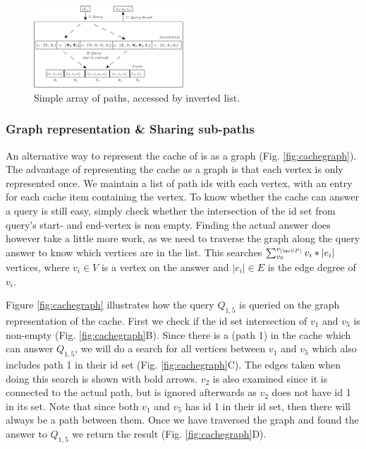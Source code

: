 \begin{figure}[hbt]
  \center
        \includegraphics[width=0.50\textwidth]{figures/cachearrayinvertlist.pdf}
        \caption{Simple array of paths, accessed by inverted list.}
  \label{fig:cacheinvertlist}
\end{figure}


\subsubsection{Graph representation \& Sharing sub-paths}%

An alternative way to represent the cache of \spaths is as a graph (Fig. \ref{fig:cachegraph}). The advantage of representing the cache as a graph is that each vertex is only represented once. We maintain a list of path ids with each vertex, with an entry for each cache item containing the vertex. 
To know whether the cache can answer a query is still easy, simply check whether the intersection of the \spath id set from query's start- and end-vertex is non empty. Finding the actual answer does however take a little more work, as we need to traverse the graph along the \spath query answer to know which vertices are in the list. This searches $\sum_{v_0}^{v_{|\spathns |}} v_i*|e_i|$ vertices, where $v_i \in V$ is a vertex on the \spath answer and $|e_i| \in E $ is the edge degree of $v_i$.

Figure \ref{fig:cachegraph} illustrates how the query $Q_{1,5}$ is queried on the graph representation of the cache. First we check if the \spath id set intersection of $v_1$ and $v_5$ is non-empty (Fig. \ref{fig:cachegraph}B). Since there is a \spath (path 1) in the cache which can answer $Q_{1,5}$, we will do a search for all vertices between $v_1$ and $v_5$ which also includes path 1 in their \spath id set (Fig. \ref{fig:cachegraph}C). The edges taken when doing this search is shown with bold arrows. $v_2$ is also examined since it is connected to the actual path, but is ignored afterwards as $v_2$ does not have \spath id 1 in its set. Note that since both $v_1$ and $v_5$ has id 1 in their \spath id set, then there will always be a path between them. Once we have traversed the graph and found the answer to $Q_{1,5}$ we return the result (Fig. \ref{fig:cachegraph}D).

